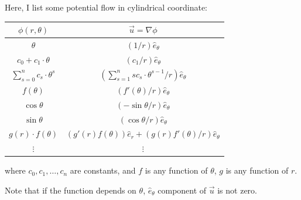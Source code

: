 \documentclass[11pt,]{beamer}
\begin{document}
\begin{frame}
	Here, I list some potential flow in cylindrical coordinate:
	\begin{table}[t]
	\begin{tabular}{c|c}
	$\phi(r,\theta)$	&	$\vec{u}=\nabla \phi$\\\hline\hline
	$\theta$	& 	$\displaystyle \left(1/r\right) \hat{e}_{\theta}$
	\\\hline
	$c_0+c_1\cdot\theta$	& 	$ \left(c_1/r\right) \hat{e}_{\theta}$
	\\\hline
	$\sum_{s=0}^{n}c_{s}\cdot\theta^{s}$	& $\left(\sum_{s=1}^{n}sc_{s}\cdot\theta^{s-1}/r\right) \hat{e}_{\theta}$
	\\\hline
	$f(\theta)$	& 	$\left(f'(\theta)/r\right) \hat{e}_{\theta}$
	\\\hline
	$\cos\theta$	& 	$\left(-\sin\theta/r\right) \hat{e}_{\theta}$
	\\\hline
	$\sin\theta$	& 	$\left(\cos\theta/r\right) \hat{e}_{\theta}$
	\\\hline
	$g(r)\cdot f(\theta)$	& 	$\left(g'(r) f(\theta)\right) \hat{e}_{r} + \left(g(r) f'(\theta)/r\right) \hat{e}_{\theta}$
	\\\hline
	$\vdots$	& 	$\vdots$\\
	\end{tabular}
	\end{table}
	where $c_0,c_1,\ldots,c_n$ are constants, and $f$ is any function of $\theta$, $g$ is any function of $r$. 
	
	Note that if the function depends on $\theta$, $\hat{e}_{\theta}$ component of $\vec{u}$ is not zero.
\end{frame}
\end{document}
